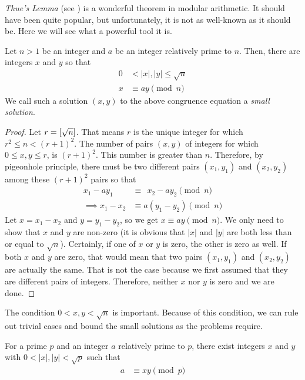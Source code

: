 \documentclass{subfile}
\begin{document}
\textit{Thue's Lemma} (see \textcite{thue_1902}) is a wonderful theorem in modular arithmetic. It should have been quite popular, but unfortunately, it is not as well-known as it should be. Here we will see what a powerful tool it is.

\begin{theorem}\label{thm:thue}
	Let $n>1$ be an integer and $a$ be an integer relatively prime to $n$. Then, there are integers $x$ and $y$ so that
	\begin{align*}
		0 &< |x|, |y| \leq \sqrt n\\
		x&\equiv ay\pmod n
	\end{align*}
	We call such a solution $(x,y)$ to the above congruence equation a \textit{small solution}.
\end{theorem}

\begin{proof}
	Let $r=\floor{\sqrt{n}}$. That means $r$ is the unique integer for which $r^2\leq n<(r+1)^2$. The number of pairs $(x,y)$ of integers for which $0\leq x,y\leq r$, is $(r+1)^2$. This number is greater than $n$. Therefore, by pigeonhole principle, there must be two different pairs $(x_1,y_1)$ and $(x_2,y_2)$ among these $(r+1)^2$ pairs so that
	\begin{align*}
		x_1-ay_1
			& \equiv \ \ x_2-ay_2 \pmod n\\
		\implies x_1-x_2
			& \equiv a(y_1-y_2) \pmod n
	\end{align*}
	Let $x=x_1-x_2$ and $y=y_1-y_2$, so we get $x\equiv ay\pmod n$. We only need to show that $x$ and $y$ are non-zero (it is obvious that $|x|$ and $|y|$ are both less than or equal to $\sqrt n$). Certainly, if one of $x$ or $y$ is zero, the other is zero as well. If both $x$ and $y$ are zero, that would mean that two pairs $(x_1,y_1)$ and $(x_2,y_2)$ are actually the same. That is not the case because we first assumed that they are different pairs of integers. Therefore, neither $x$ nor $y$ is zero and we are done.
\end{proof}

	\begin{note}
		The condition $0<x,y<\sqrt{n}$ is important. Because of this condition, we can rule out trivial cases and bound the small solutions as the problems require.
	\end{note}

	\begin{corollary}
		For a prime $p$ and an integer $a$ relatively prime to $p$, there exist integers $x$ and $y$ with $0<|x|,|y|<\sqrt{p}$ such that
		\begin{align*}
			a & \equiv xy\pmod p
		\end{align*}
	\end{corollary}
\end{document}
